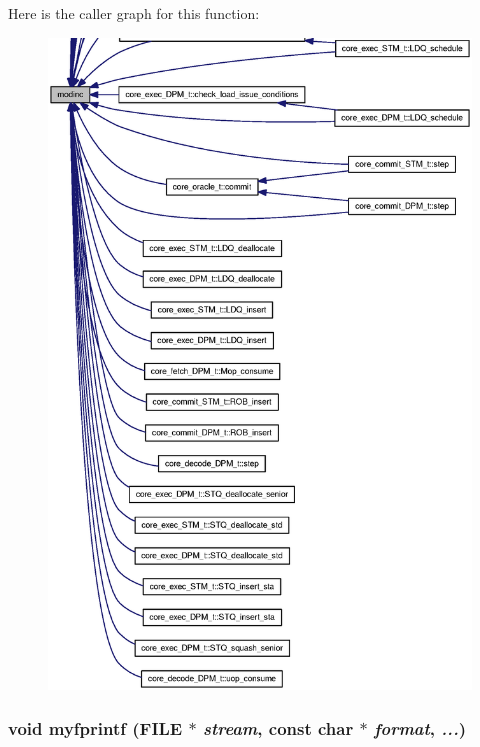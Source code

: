 Here is the caller graph for this function:\nopagebreak
\begin{figure}[H]
\begin{center}
\leavevmode
\includegraphics[width=420pt]{misc_8h_ec0decc56f83415e5cd152f876e5dde1_icgraph}
\end{center}
\end{figure}
\subsubsection[{myfprintf}]{\setlength{\rightskip}{0pt plus 5cm}void myfprintf (FILE $\ast$ {\em stream}, \/  const char $\ast$ {\em format}, \/   {\em ...})}\label{misc_8h_43c5d13cbc547afe9061282a5b562e85}


